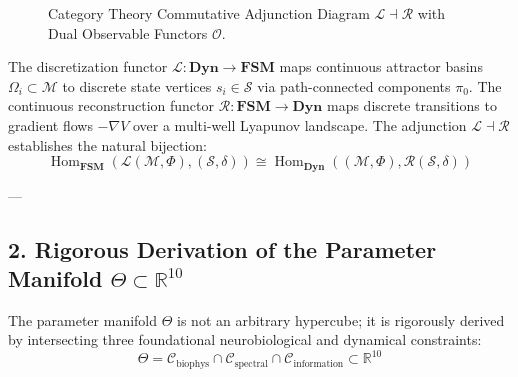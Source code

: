 \documentclass[11pt,twoside,a4paper]{article}
\begin{document}
\begin{figure}[H]
\centering
{}
\caption{Category Theory Commutative Adjunction Diagram $\mathcal{L} \dashv \mathcal{R}$ with Dual Observable Functors $\mathcal{O}$.}
\label{fig:adjunction_comm}
\end{figure}

The discretization functor $\mathcal{L}: \mathbf{Dyn} \to \mathbf{FSM}$ maps continuous attractor basins $\Omega_i \subset \mathcal{M}$ to discrete state vertices $s_i \in \mathcal{S}$ via path-connected components $\pi_0$. The continuous reconstruction functor $\mathcal{R}: \mathbf{FSM} \to \mathbf{Dyn}$ maps discrete transitions to gradient flows $-\nabla V$ over a multi-well Lyapunov landscape. The adjunction $\mathcal{L} \dashv \mathcal{R}$ establishes the natural bijection:
\begin{equation}
\operatorname{Hom}_{\mathbf{FSM}}(\mathcal{L}(\mathcal{M}, \Phi), (\mathcal{S}, \delta)) \cong \operatorname{Hom}_{\mathbf{Dyn}}((\mathcal{M}, \Phi), \mathcal{R}(\mathcal{S}, \delta))
\end{equation}

---

\subsection{2. Rigorous Derivation of the Parameter Manifold $\Theta \subset \mathbb{R}^{10}$}

The parameter manifold $\Theta$ is not an arbitrary hypercube; it is rigorously derived by intersecting three foundational neurobiological and dynamical constraints:
\begin{equation}
\Theta = \mathcal{C}_{\text{biophys}} \cap \mathcal{C}_{\text{spectral}} \cap \mathcal{C}_{\text{information}} \subset \mathbb{R}^{10}
\end{equation}
\end{document}
